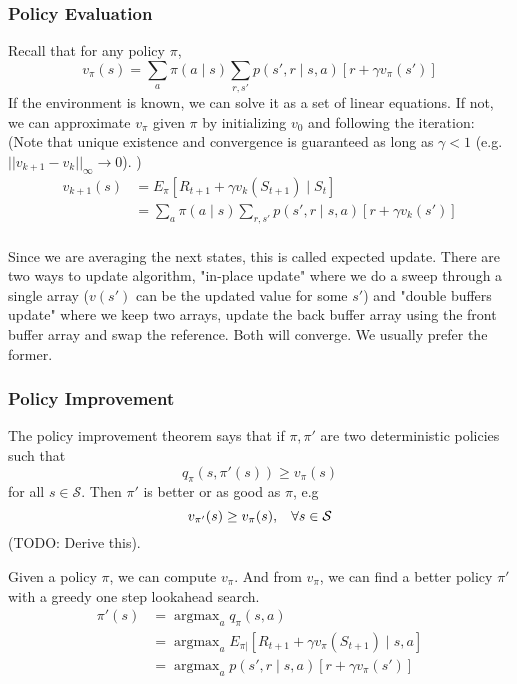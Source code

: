 \documentclass[twocolumn, 10pt]{article}
\DeclareMathOperator*{\argmax}{argmax}
\newcommand{\stateset}{\mathcal{S}}
\begin{document}
	\subsubsection*{Policy Evaluation}
	Recall that for any policy $\pi$,  $$v_{\pi} (s)  = \sum_{a} \pi(a \mid s)  \sum_{r, s'}   p(s', r \mid s, a)   \left[ r  + \gamma v_{\pi}(s')  \right]$$
	If the environment is known, we can solve it as a set of linear equations. If not, we can approximate $v_{\pi}$ given $\pi$ by initializing $v_0$ and following the iteration: (Note that unique existence and convergence is guaranteed as long as $\gamma < 1$ (e.g.  $||v_{k+1} - v_k||_\infty \rightarrow 0$). )
	$$ \begin{aligned}
	v_{k+1} (s)  &= E_{\pi} [R_{t+1} + \gamma v_k(S_{t+1}) \mid S_t]  \\
	&=  \sum_{a} \pi(a \mid s)  \sum_{r, s'}   p(s', r \mid s, a)   \left[ r  + \gamma v_{k}(s')  \right] \\
	\end{aligned}$$
	
	Since we are averaging the next states, this is called expected update. There are two ways to update algorithm, "in-place update" where we do a sweep through a single array ($v(s')$ can be the updated value for some $s'$) and "double buffers update" where we keep two arrays, update the back buffer array using the front buffer array and swap the reference. Both will converge. We usually prefer the former.
	
	\subsubsection*{Policy Improvement}
	The policy improvement theorem says that if $\pi,  \pi'$ are two deterministic policies such that $$q_{\pi} (s, \pi'(s))  \geq v_{\pi}(s)$$ for all $s \in \stateset$. Then $\pi'$ is better or as good as $\pi$, e.g $$ v_{\pi'}(s) \geq v_{\pi}(s), \hspace{2ex} \forall s \in \stateset$$ (TODO: Derive this).
	
	Given a policy $\pi$, we can compute $v_{\pi}$. And from $v_{\pi}$,  we can find a better policy $\pi'$ with a greedy one step lookahead search. 
	$$  
	\begin{aligned}
	\pi'(s)  &= \argmax_{a} q_{\pi}(s, a) \\
	&= \argmax_{a} E_{\pi|} [ R_{t+ 1} + \gamma v_{\pi} (S_{t+1}) \mid  s, a] \\
	&= \argmax_{a} p(s', r \mid s , a) [r + \gamma v_{\pi}(s')]
	\end{aligned}
	$$
	
\end{document}
